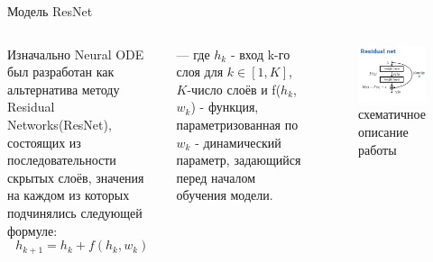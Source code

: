 \documentclass{beamer}
\begin{document}
\begin{frame}{Модель ResNet}

\begin{columns}[c]
\par Изначально Neural ODE был разработан как альтернатива методу Residual Networks(ResNet), состоящих из последовательности скрытых слоёв, значения на каждом из которых подчинялись следующей формуле:
    \begin{equation} h_{k+1} = h_k + f(h_k, w_k)    \end{equation}
    \par --- где $h_k$ - вход k-го слоя для $k \in [1, K]$, $K$-число слоёв и f($h_k$, $w_k$) - функция, параметризованная по $w_k$ - динамический параметр, задающийся перед началом обучения модели.
\begin{figure}
\includegraphics[width=1.0\textwidth]{resnet.jpg}
    \caption{схематичное описание работы}
\end{figure}
\end{columns}

\end{frame}
\end{document}
